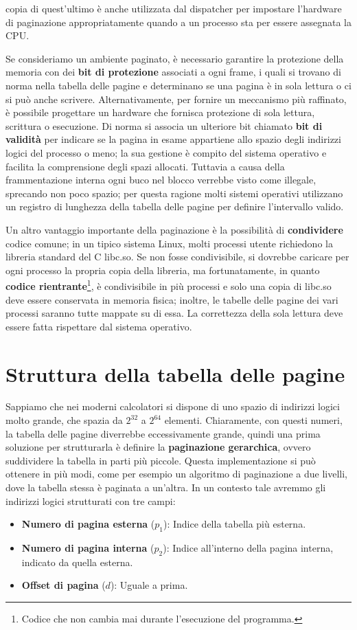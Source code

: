 copia di quest'ultimo è anche utilizzata dal dispatcher per impostare l'hardware di paginazione appropriatamente quando a un processo sta per essere
assegnata la CPU.\par
Se consideriamo un ambiente paginato, è necessario garantire la protezione della memoria con dei \textbf{bit di protezione} associati a ogni frame, i
quali si trovano di norma nella tabella delle pagine e determinano se una pagina è in sola lettura o ci si può anche scrivere. Alternativamente, per
fornire un meccanismo più raffinato, è possibile progettare un hardware che fornisca protezione di sola lettura, scrittura o esecuzione. Di norma si
associa un ulteriore bit chiamato \textbf{bit di validità} per indicare se la pagina in esame appartiene allo spazio degli indirizzi logici del processo
o meno; la sua gestione è compito del sistema operativo e facilita la comprensione degli spazi allocati. Tuttavia a causa della frammentazione interna
ogni buco nel blocco verrebbe visto come illegale, sprecando non poco spazio; per questa ragione molti sistemi operativi utilizzano un registro di
lunghezza della tabella delle pagine per definire l'intervallo valido.\par
Un altro vantaggio importante della paginazione è la possibilità di \textbf{condividere} codice comune; in un tipico sistema Linux, molti processi
utente richiedono la libreria standard del C libc.so. Se non fosse condivisibile, si dovrebbe caricare per ogni processo la propria copia della libreria,
ma fortunatamente, in quanto \textbf{codice rientrante}\footnote{Codice che non cambia mai durante l'esecuzione del programma.}, è condivisibile in
più processi e solo una copia di libc.so deve essere conservata in memoria fisica; inoltre, le tabelle delle pagine dei vari processi saranno tutte
mappate su di essa. La correttezza della sola lettura deve essere fatta rispettare dal sistema operativo.

%

\section{Struttura della tabella delle pagine}
Sappiamo che nei moderni calcolatori si dispone di uno spazio di indirizzi logici molto grande, che spazia da $2^{32}$ a $2^{64}$ elementi. Chiaramente,
con questi numeri, la tabella delle pagine diverrebbe eccessivamente grande, quindi una prima soluzione per strutturarla è definire la \textbf{
paginazione gerarchica}, ovvero suddividere la tabella in parti più piccole. Questa implementazione si può ottenere in più modi, come per esempio un
algoritmo di paginazione a due livelli, dove la tabella stessa è paginata a un'altra. In un contesto tale avremmo gli indirizzi logici strutturati con
tre campi: \begin{itemize}
    \item \textbf{Numero di pagina esterna} ($p_1$): Indice della tabella più esterna.
    \item \textbf{Numero di pagina interna} ($p_2$): Indice all'interno della pagina interna, indicato da quella esterna.
    \item \textbf{Offset di pagina} ($d$): Uguale a prima.
\end{itemize}

